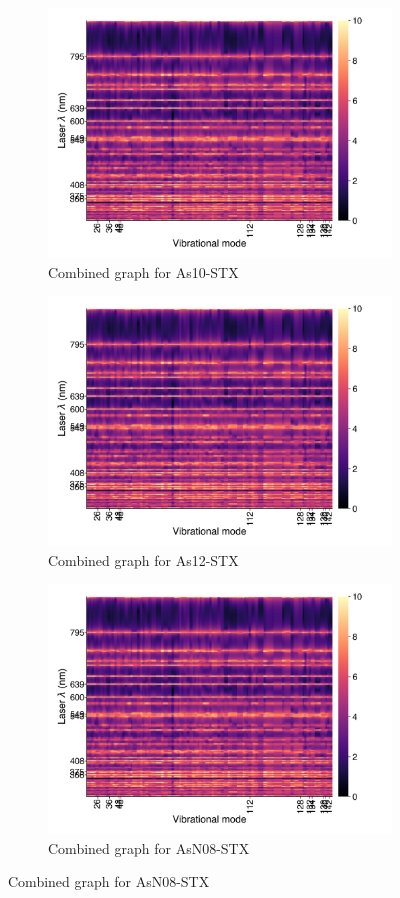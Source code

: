 \documentclass[
	fontsize=10pt, %
	twoside=true, %
	numbers=noenddot, %
]{kaobook}
\begin{document}
\begin{figure}[h]
\centering
\begin{subfigure}{8.25cm}\centering\includegraphics{comb-as12}\caption{Combined graph for As10-STX}\end{subfigure}%
\begin{subfigure}{8.25cm}\centering\includegraphics{comb-as12}\caption{Combined graph for As12-STX}\end{subfigure}
\begin{subfigure}{8.25cm}\centering\includegraphics{comb-as12}\caption{Combined graph for AsN08-STX}\end{subfigure}%

\end{figure}
\end{document}
